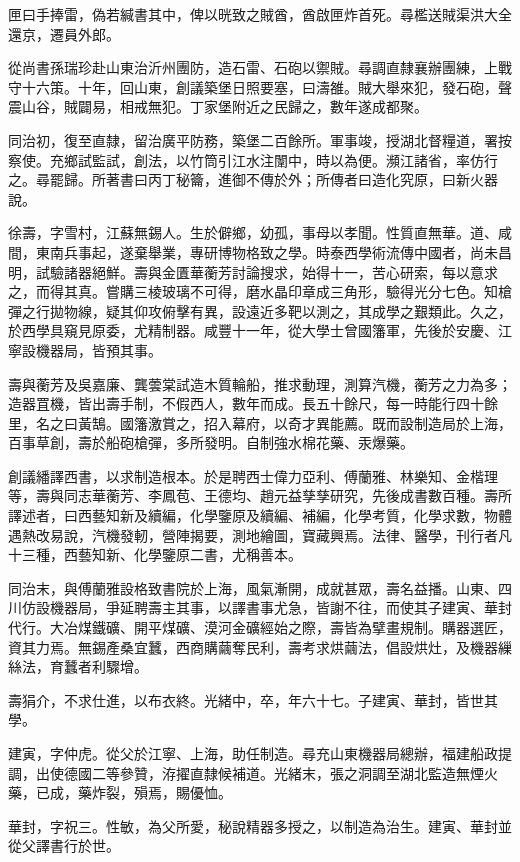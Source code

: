 \begin{pinyinscope}
匣曰手捧雷，偽若緘書其中，俾以晄致之賊酋，酋啟匣炸首死。尋檻送賊渠洪大全還京，遷員外郎。

從尚書孫瑞珍赴山東治沂州團防，造石雷、石砲以禦賊。尋調直隸襄辦團練，上戰守十六策。十年，回山東，創議築堡日照要塞，曰濤雒。賊大舉來犯，發石砲，聲震山谷，賊闢易，相戒無犯。丁家堡附近之民歸之，數年遂成都聚。

同治初，復至直隸，留治廣平防務，築堡二百餘所。軍事竣，授湖北督糧道，署按察使。充鄉試監試，創法，以竹筒引江水注闈中，時以為便。瀕江諸省，率仿行之。尋罷歸。所著書曰丙丁秘籥，進御不傳於外；所傳者曰造化究原，曰新火器說。

徐壽，字雪村，江蘇無錫人。生於僻鄉，幼孤，事母以孝聞。性質直無華。道、咸間，東南兵事起，遂棄舉業，專研博物格致之學。時泰西學術流傳中國者，尚未昌明，試驗諸器絕鮮。壽與金匱華蘅芳討論搜求，始得十一，苦心研索，每以意求之，而得其真。嘗購三棱玻璃不可得，磨水晶印章成三角形，驗得光分七色。知槍彈之行拋物線，疑其仰攻俯擊有異，設遠近多靶以測之，其成學之艱類此。久之，於西學具窺見原委，尤精制器。咸豐十一年，從大學士曾國籓軍，先後於安慶、江寧設機器局，皆預其事。

壽與蘅芳及吳嘉廉、龔蕓棠試造木質輪船，推求動理，測算汽機，蘅芳之力為多；造器罝機，皆出壽手制，不假西人，數年而成。長五十餘尺，每一時能行四十餘里，名之曰黃鵠。國籓激賞之，招入幕府，以奇才異能薦。既而設制造局於上海，百事草創，壽於船砲槍彈，多所發明。自制強水棉花藥、汞爆藥。

創議繙譯西書，以求制造根本。於是聘西士偉力亞利、傅蘭雅、林樂知、金楷理等，壽與同志華蘅芳、李鳳苞、王德均、趙元益孳孳研究，先後成書數百種。壽所譯述者，曰西藝知新及續編，化學鑒原及續編、補編，化學考質，化學求數，物體遇熱改易說，汽機發軔，營陣揭要，測地繪圖，寶藏興焉。法律、醫學，刊行者凡十三種，西藝知新、化學鑒原二書，尤稱善本。

同治末，與傅蘭雅設格致書院於上海，風氣漸開，成就甚眾，壽名益播。山東、四川仿設機器局，爭延聘壽主其事，以譯書事尤急，皆謝不往，而使其子建寅、華封代行。大冶煤鐵礦、開平煤礦、漠河金礦經始之際，壽皆為擘畫規制。購器選匠，資其力焉。無錫產桑宜蠶，西商購繭奪民利，壽考求烘繭法，倡設烘灶，及機器繅絲法，育蠶者利驟增。

壽狷介，不求仕進，以布衣終。光緒中，卒，年六十七。子建寅、華封，皆世其學。

建寅，字仲虎。從父於江寧、上海，助任制造。尋充山東機器局總辦，福建船政提調，出使德國二等參贊，洊擢直隸候補道。光緒末，張之洞調至湖北監造無煙火藥，已成，藥炸裂，殞焉，賜優恤。

華封，字祝三。性敏，為父所愛，秘說精器多授之，以制造為治生。建寅、華封並從父譯書行於世。


\end{pinyinscope}